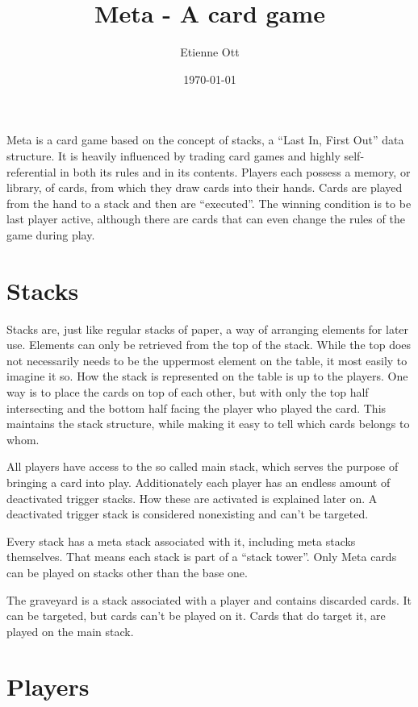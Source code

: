 \documentclass[a4paper,10pt]{article}
\title{Meta - A card game}
\author{Etienne Ott}
\date{\today}
\begin{document}
\maketitle

Meta is a card game based on the concept of stacks, a ``Last In, First Out'' data
structure. It is heavily influenced by trading card games and highly self-referential in
both its rules and in its contents. Players each possess a memory, or library, of cards,
from which they draw cards into their hands. Cards are played from the hand to a stack
and then are ``executed''. The winning condition is to be last player active, although
there are cards that can even change the rules of the game during play.

\section{Stacks}

Stacks are, just like regular stacks of paper, a way of arranging elements for later use.
Elements can only be retrieved from the top of the stack. While the top does not
necessarily needs to be the uppermost element on the table, it most easily to imagine it
so.
How the stack is represented on the table is up to the players. One way is to place the
cards on top of each other, but with only the top half intersecting and the bottom half
facing the player who played the card. This maintains the stack structure, while making
it easy to tell which cards belongs to whom.

All players have access to the so called main stack, which serves the purpose of bringing
a card into play. Additionately each player has an endless amount of deactivated trigger
stacks. How these are activated is explained later on. A deactivated trigger stack is
considered nonexisting and can't be targeted.

Every stack has a meta stack associated with it, including meta stacks themselves. That
means each stack is part of a ``stack tower''. Only Meta cards can be played on stacks
other than the base one. 

The graveyard is a stack associated with a player and contains discarded cards. It can be
targeted, but cards can't be played on it. Cards that do target it, are played on the
main stack.

\section{Players}
\end{document}
